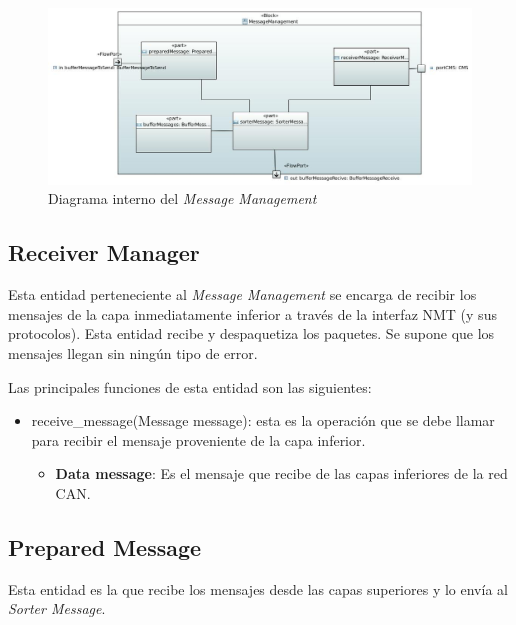 \begin{figure}[h!]
 \centering
 \includegraphics[scale=0.4]{images/Secciones/AppendixA/MessageManagementInternalDiagram.JPG}
  \caption{Diagrama interno del \textit{Message Management}}
\label{fig:Arq_Message_Management_Internal}
\end{figure}

\subsection{Receiver Manager}
Esta entidad perteneciente al \textit{Message Management} se encarga de recibir
los mensajes de la capa inmediatamente inferior a través de la interfaz NMT (y
sus protocolos). Esta entidad recibe y despaquetiza los paquetes. Se supone que
los mensajes llegan sin ningún tipo de error.

Las principales funciones de esta entidad son las siguientes:
\begin{itemize}
\item receive\_message(Message message): esta es la operación que se debe llamar
  para recibir el mensaje proveniente de la capa inferior. 
  \begin{itemize}
  \item \textbf{Data message}: Es el mensaje que recibe de las capas inferiores
    de la red CAN.
  \end{itemize}
\end{itemize}

\subsection{Prepared Message}
Esta entidad es la que recibe los mensajes desde las capas superiores y lo envía
al \textit{Sorter Message}.

